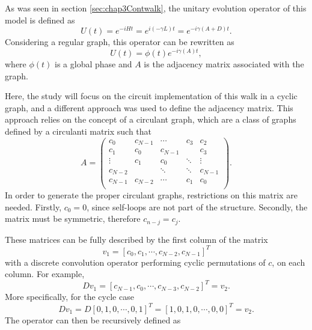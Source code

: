 \documentclass[../../dissertation.tex]{subfiles}
\begin{document}
As was seen in section \ref{sec:chap3Contwalk}, the unitary evolution operator of this model is defined as
\begin{equation}
        U(t) = e^{-iHt} = e^{i(-\gamma L)t} = e^{-i\gamma(A+D)t}.
\end{equation}
Considering a regular graph, this operator can be rewritten as 
\begin{equation}
	U(t) = \phi(t) e^{-i\gamma(A)t},
\end{equation}
where $\phi(t)$ is a global phase and $A$ is the adjacency matrix associated with the graph.\par
Here, the study will focus on the circuit implementation of this walk in a cyclic graph, and a different approach was used to define the adjacency matrix. This approach relies on the concept of a circulant graph, which are a class of graphs defined by a circulanti matrix such that
\begin{equation}
A = 
	\begin{pmatrix}
		c_0&c_{N-1}& \cdots&c_3&c_2 \\
		c_1&c_0& c_{N-1}& &c_{3} \\
		\vdots & c_1 & c_0 &\ddots & \vdots\\
		c_{N-2}& & \ddots&\ddots &c_{N-1}\\
		c_{N-1} & c_{N-2} & \cdots & c_1 & c_0\\
	\end{pmatrix}.
\label{eq:adjCirculant}
\end{equation}
In order to generate the proper circulant graphs, restrictions on this matrix are needed. Firstly, $c_0=0$, since self-loops are not part of the structure. Secondly, the matrix must be symmetric, therefore $c_{n-j} = c_j$.\par
These matrices can be fully described by the first column of the matrix 
\begin{equation}
	v_1 = [c_{0},c_{1}, \cdots, c_{N-2}, c_{N-1}]^T 
\end{equation}
with a discrete convolution operator performing cyclic permutations of $c$, on each column. For example,
\begin{equation}
	D v_1 = [c_{N-1}, c_{0}, \cdots, c_{N-3}, c_{N-2}]^T = v_2.
\end{equation}
More specifically, for the cycle case
\begin{equation}
	D v_1 = D [0, 1 ,0 , \cdots, 0, 1]^T =[1, 0, 1, 0, \cdots, 0, 0]^T = v_2.
\end{equation}
The operator can then be recursively defined as
\end{document}
